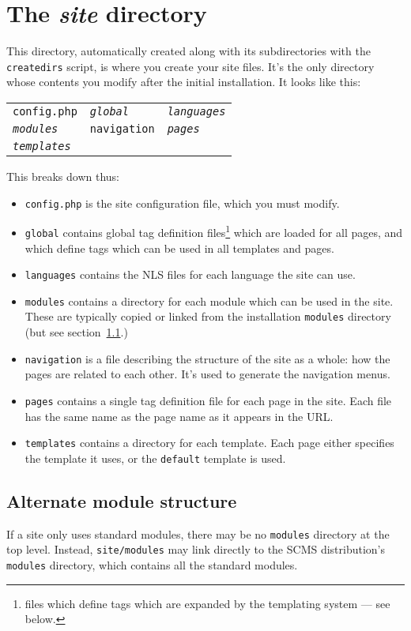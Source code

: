 \section{The \emph{site} directory}
This directory, automatically created along with its subdirectories with the
\texttt{createdirs} script, is where you create your site files. It's the only
directory whose contents you modify after the initial installation. It looks
like this:
\begin{center}
\begin{tabular}{lll}
\texttt{config.php} & \emph{\texttt{global}} & \emph{\texttt{languages}}  \\ 
\emph{\texttt{modules}} & \texttt{navigation} & \emph{\texttt{pages}} \\
\emph{\texttt{templates}}
\end{tabular}
\end{center}
This breaks down thus:
\begin{itemize}
 \item \texttt{config.php} is the site configuration file, which you must modify.
\item \texttt{global} contains global tag definition files\footnote{files which define tags which are expanded by the templating system --- see below.} which are loaded for all pages, and which define tags which can be used in all templates and pages.
\item \texttt{languages} contains the NLS files for each language the site can use.
\item \texttt{modules} contains a directory for each module which can be used in the site. These are typically copied or linked from the installation \texttt{modules} directory
 (but see section~\ref{alternatemod}.)
\item \texttt{navigation} is a file describing the structure of the site as a whole: how the pages are related to each other. It's used to generate the navigation menus.
\item \texttt{pages} contains a single tag definition file for each page in the site. Each file has the same name as the page name as it appears in the URL.
\item \texttt{templates} contains a directory for each template. Each page either specifies the template it uses, or the \texttt{default} template is used.
\end{itemize}

\subsection{Alternate module structure}
\label{alternatemod}
If a site only uses standard modules, there may be no \texttt{modules} directory at the top level. Instead, \texttt{site/modules} may link directly
to the SCMS distribution's \texttt{modules} directory, which contains all the standard modules.



